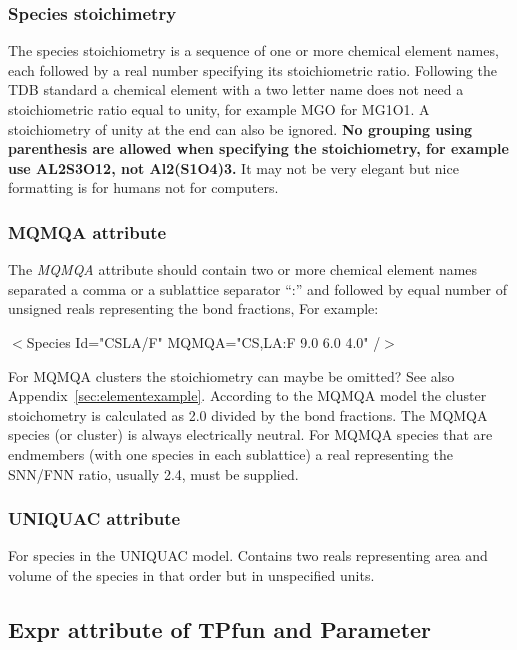 \documentclass{article}
\begin{document}
\subsubsection{Species stoichimetry}\label{sec:speciesSS}

The species stoichiometry is a sequence of one or more chemical
element names, each followed by a real number specifying its
stoichiometric ratio.  Following the TDB standard a chemical element
with a two letter name does not need a stoichiometric ratio equal to
unity, for example MGO for MG1O1.  A stoichiometry of unity at the end
can also be ignored.  {\bf No grouping using parenthesis are allowed
  when specifying the stoichiometry, for example use AL2S3O12, not
  Al2(S1O4)3.}  It may not be very elegant but nice formatting is for
humans not for computers.

\subsubsection{MQMQA attribute}\label{sec:mqmqa}
The {\em MQMQA} attribute should contain two or more chemical element
names separated a comma or a sublattice separator ``:'' and followed
by equal number of unsigned reals representing the bond fractions, For
example:

  $<$Species Id="CSLA/F"  MQMQA="CS,LA:F  9.0 6.0 4.0" /$>$

For MQMQA clusters the stoichiometry can maybe be omitted?  See also
Appendix~\ref{sec:elementexample}.  According to the MQMQA model the
cluster stoichometry is calculated as 2.0 divided by the bond
fractions.  The MQMQA species (or cluster) is always electrically
neutral.  For MQMQA species that are endmembers (with one species in
each sublattice) a real representing the SNN/FNN ratio, usually 2.4,
must be supplied.

\subsubsection{UNIQUAC attribute}\label{sec:uniquac}

For species in the UNIQUAC model.  Contains two reals representing
area and volume of the species in that order but in unspecified units.

\subsection{Expr attribute of TPfun and Parameter}\label{sec:tpfunattr}\label{sec:expr}
\end{document}
